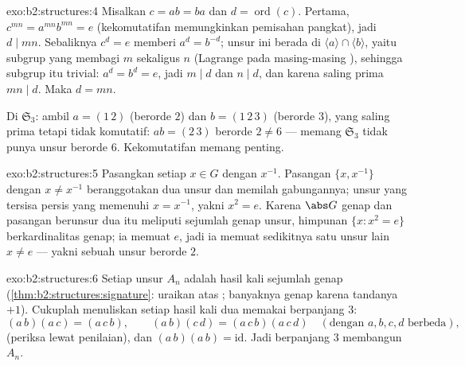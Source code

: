\begin{solution}{exo:b2:structures:4}
Misalkan $c = ab = ba$ dan $d = \operatorname{ord}(c)$. Pertama, $c^{mn} =
a^{mn} b^{mn} = e$ (kekomutatifan memungkinkan pemisahan pangkat), jadi
$d \mid mn$. Sebaliknya $c^d = e$ memberi $a^d = b^{-d}$; unsur ini
berada di $\langle a\rangle \cap \langle b\rangle$, yaitu subgrup yang
 membagi $m$ sekaligus $n$ (Lagrange pada masing-masing ), sehingga subgrup itu trivial: $a^d = b^d = e$, jadi $m \mid d$
dan $n \mid d$, dan karena saling prima $mn \mid d$. Maka $d = mn$.

Di $\mathfrak{S}_3$: ambil $a = (1\,2)$ (berorde $2$) dan $b =
(1\,2\,3)$ (berorde $3$), yang  saling prima tetapi tidak
komutatif: $ab = (2\,3)$ berorde $2 \neq 6$ --- memang $\mathfrak{S}_3$
tidak punya unsur berorde $6$. Kekomutatifan memang penting.
\end{solution}

\begin{solution}{exo:b2:structures:5}
Pasangkan setiap $x \in G$ dengan $x^{-1}$. Pasangan $\{x, x^{-1}\}$
dengan $x \neq x^{-1}$ beranggotakan dua unsur dan memilah gabungannya;
unsur yang tersisa persis yang memenuhi $x = x^{-1}$, yakni $x^2 =
e$. Karena $\abs G$ genap dan pasangan berunsur dua itu meliputi
sejumlah genap unsur, himpunan $\{x : x^2 = e\}$ berkardinalitas genap;
ia memuat $e$, jadi ia memuat sedikitnya satu unsur lain $x \neq
e$ --- yakni sebuah unsur berorde $2$.
\end{solution}

\begin{solution}{exo:b2:structures:6}
Setiap unsur $A_n$ adalah hasil kali sejumlah genap 
(\cref{thm:b2:structures:signature}: uraikan atas ;
banyaknya genap karena tandanya $+1$). Cukuplah menuliskan setiap hasil
kali dua  memakai  berpanjang $3$:
\[
(a\,b)(a\,c) = (a\,c\,b),
\qquad
(a\,b)(c\,d) = (a\,c\,b)(a\,c\,d) \quad (\text{dengan } a,b,c,d \text{ berbeda}),
\]
(periksa lewat penilaian), dan $(a\,b)(a\,b) = \mathrm{id}$. Jadi
 berpanjang $3$ membangun $A_n$.
\end{solution}

